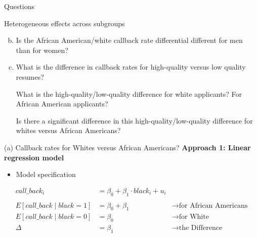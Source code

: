 \documentclass[
  10pt,
  ignorenonframetext,
]{beamer}
\providecommand{\tightlist}{%
  \setlength{\itemsep}{0pt}\setlength{\parskip}{0pt}}
\begin{document}
\begin{frame}{Questions}
\protect\hypertarget{questions-1}{}
\begin{block}{Heterogeneous effects across subgroups}
\protect\hypertarget{heterogeneous-effects-across-subgroups}{}
\begin{enumerate}
[(a)]
\setcounter{enumi}{1}
\tightlist
\item
  Is the African American/white callback rate differential different for
  men than for women?
\end{enumerate}

\vspace{0.8mm}

\begin{enumerate}
[(a)]
\setcounter{enumi}{2}
\item
  What is the difference in callback rates for high-quality versus low
  quality resumes?

  What is the high-quality/low-quality difference for white applicants?
  For African American applicants?

  Is there a significant difference in this high-quality/low-quality
  difference for whites versus African Americans?
\end{enumerate}
\end{block}
\end{frame}

\begin{frame}{(a) Callback rates for Whites versus African Americans?}
\protect\hypertarget{a-callback-rates-for-whites-versus-african-americans}{}
\textbf{Approach 1: Linear regression model}

\begin{itemize}
\tightlist
\item
  Model specification
\end{itemize}

\[
\begin{aligned}
call\_back_i &= \beta_0 + \beta_1\cdot black_i + u_i\\
\\
E[call\_back \mid black = 1] &= \beta_0 + \beta_1 &\rightarrow \text{for African Americans}\\
E[call\_back \mid black = 0] &= \beta_0 &\rightarrow \text{for White}\\
\Delta &= \beta_1 &\rightarrow \text{the Difference}
\end{aligned}
\]
\end{frame}
\end{document}
